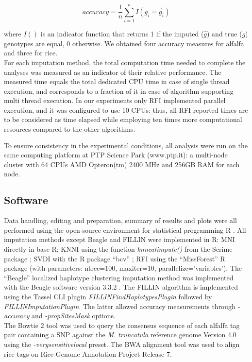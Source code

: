 \begin{equation}
\label{eq:accuracy}
accuracy = \frac{1}{n} \sum_{i=1}^{n}{I(g_i = \hat{g_i})}
\end{equation}

where $I()$ is an indicator function that returns 1 if the imputed ($\hat{g}$) and true ($g$) genotypes are equal, 0 otherwise. We obtained four accuracy measures for alfalfa and three for rice.\\
For each imputation method, the total computation time needed to complete the analyses was measured as an indicator of their relative performance. The measured time equals the total dedicated CPU time in case of single thread execution, and corresponds to a fraction of it in case of algorithm supporting multi thread execution. In our experiments only RFI implemented parallel execution, and it was configured to use 10 CPUs: thus, all RFI reported times are to be considered as time elapsed while employing ten times more computational resources compared to the other algorithms.

To ensure consistency in the experimental conditions, all analysis were run on the same computing platform at PTP Science Park (www.ptp.it): a multi-node cluster with 64 CPUs AMD Opteron(tm) 2400 MHz and 256GB RAM for each node.
 
\subsection{Software}
\label{sec:software}
Data handling, editing and preparation, summary of results and plots were all performed using the open-source environment for statistical programming R \cite{r_core_team_r:_2014}. All imputation methods except Beagle and FILLIN were implemented in R: MNI directly in base R; KNNI using the function \emph{knncatimpute()} from the Scrime package \cite{schwender_scrime:_2013}; SVDI with the R package ``bcv'' \cite{perry_bcv:_2009}; RFI using the ``MissForest'' \cite{stekhoven_missforestnon-parametric_2012} R package (with parameters: ntree=100, maxiter=10, parallelize='variables'). The ``Beagle'' localized haplotype clustering imputation method was implemented with the Beagle software version 3.3.2 \cite{browning_rapid_2007}. The FILLIN algorithm \cite{swarts_novel_2014} is implemented using the Tassel CLI plugin \emph{FILLINFindHaplotypesPlugin} followed by \emph{FILLINImputationPlugin}. The latter allowed accuracy measurements through \emph{-accuracy} and \emph{-propSitesMask} options.\\
The Bowtie 2 tool \cite{langmead_fast_2012} was used to query the consensus sequence of each alfalfa tag pair containing a SNP against the \emph{M. truncatula} reference genome Version 4.0 using the \emph{-verysensitivelocal} preset. The BWA alignment tool \cite{li2009fast} was used to align rice tags on Rice Genome Annotation Project Release 7.

